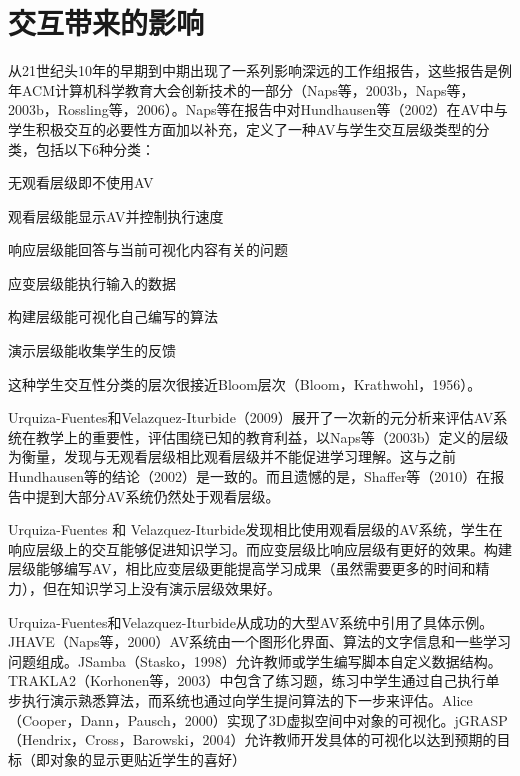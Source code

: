 \chapter{交互带来的影响}
\begin{sectext}
从21世纪头10年的早期到中期出现了一系列影响深远的工作组报告，这些报告是例年ACM计算机科学教育大会创新技术的一部分（Naps等，2003b，Naps等，2003b，Rossling等，2006）。Naps等在报告中对Hundhausen等（2002）在AV中与学生积极交互的必要性方面加以补充，定义了一种AV与学生交互层级类型的分类，包括以下6种分类：

\begin{itemlist}
\item 无观看层级即不使用AV

\item 观看层级能显示AV并控制执行速度

\item 响应层级能回答与当前可视化内容有关的问题

\item 应变层级能执行输入的数据

\item 构建层级能可视化自己编写的算法

\item 演示层级能收集学生的反馈
\end{itemlist}

这种学生交互性分类的层次很接近Bloom层次（Bloom，Krathwohl，1956）。

Urquiza-Fuentes和Velazquez-Iturbide（2009）展开了一次新的元分析来评估AV系统在教学上的重要性，评估围绕已知的教育利益，以Naps等（2003b）定义的层级为衡量，发现与无观看层级相比观看层级并不能促进学习理解。这与之前Hundhausen等的结论（2002）是一致的。而且遗憾的是，Shaffer等（2010）在报告中提到大部分AV系统仍然处于观看层级。

Urquiza-Fuentes 和 Velazquez-Iturbide发现相比使用观看层级的AV系统，学生在响应层级上的交互能够促进知识学习。而应变层级比响应层级有更好的效果。构建层级能够编写AV，相比应变层级更能提高学习成果（虽然需要更多的时间和精力），但在知识学习上没有演示层级效果好。

Urquiza-Fuentes和Velazquez-Iturbide从成功的大型AV系统中引用了具体示例。JHAVE（Naps等，2000）AV系统由一个图形化界面、算法的文字信息和一些学习问题组成。JSamba（Stasko，1998）允许教师或学生编写脚本自定义数据结构。TRAKLA2（Korhonen等，2003）中包含了练习题，练习中学生通过自己执行单步执行演示熟悉算法，而系统也通过向学生提问算法的下一步来评估。Alice（Cooper，Dann，Pausch，2000）实现了3D虚拟空间中对象的可视化。jGRASP（Hendrix，Cross，Barowski，2004）允许教师开发具体的可视化以达到预期的目标（即对象的显示更贴近学生的喜好）


\end{sectext}
